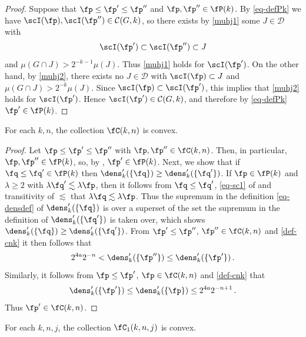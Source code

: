 \begin{proof}
    \leanok
    Suppose that $\fp \le \fp' \le \fp''$ and $\fp, \fp'' \in \fP(k)$. By \eqref{eq-defPk} we have $\scI(\fp), \scI(\fp'') \in \mathcal{C}(G,k)$, so there exists by \eqref{muhj1} some $J \in \mathcal{D}$ with
    $$
        \scI(\fp') \subset \scI(\fp'') \subset J
    $$
    and $\mu(G \cap J) > 2^{-k-1} \mu(J)$. Thus \eqref{muhj1} holds for $\scI(\fp')$. On the other hand, by \eqref{muhj2}, there exists no $J \in \mathcal{D}$ with $\scI(\fp) \subset J$ and $\mu(G \cap J) > 2^{-k} \mu(J)$. Since $\scI(\fp) \subset \scI(\fp')$, this implies that \eqref{muhj2} holds for $\scI(\fp')$. Hence $\scI(\fp') \in \mathcal{C}(G,k)$, and therefore by \eqref{eq-defPk} $\fp' \in \fP(k)$.
\end{proof}

\begin{lemma}[C convex]
    \label{C-convex}
    \leanok
    For each $k,n$, the collection $\fC(k,n)$ is convex.
\end{lemma}

\begin{proof}
    \leanok
    Let $\fp \le \fp' \le \fp''$ with $\fp, \fp'' \in \fC(k,n)$. Then, in particular, $\fp, \fp'' \in \fP(k)$, so, by , $\fp' \in \fP(k)$. Next, we show that if $\fq \le \fq' \in \fP(k)$ then $\dens'_k(\{\fq\}) \ge \dens_k'(\{\fq'\})$. If $\fp \in \fP(k)$ and $\lambda \ge 2$ with $\lambda \fq' \lesssim \lambda \fp$, then it follows from $\fq \le \fq'$, \eqref{eq-sc1} of  and transitivity of $\lesssim$ that $\lambda \fq \lesssim \lambda \fp$. Thus the supremum in the definition \eqref{eq-densdef} of $\dens_k'(\{\fq\})$ is over a superset of the set the supremum in the definition of $\dens_k'(\{\fq'\})$ is taken over, which shows $\dens'_k(\{\fq\}) \ge \dens_k'(\{\fq'\})$. From $\fp' \le \fp''$, $\fp'' \in \fC(k,n)$ and \eqref{def-cnk} it then follows that
    $$
        2^{4a}2^{-n} < \dens_k'(\{\fp''\}) \le \dens_k'(\{\fp'\})\,.
    $$
    Similarly, it follows from $\fp \le \fp'$, $\fp \in \fC(k,n)$ and \eqref{def-cnk} that
    $$
        \dens_k'(\{\fp'\}) \le \dens_k'(\{\fp\}) \le 2^{4a}2^{-n+1}\,.
    $$
    Thus $\fp' \in \fC(k,n)$.
\end{proof}

\begin{lemma}[C1 convex]
    \label{C1-convex}
    \leanok
    For each $k,n,j$, the collection $\fC_1(k,n,j)$ is convex.
\end{lemma}

